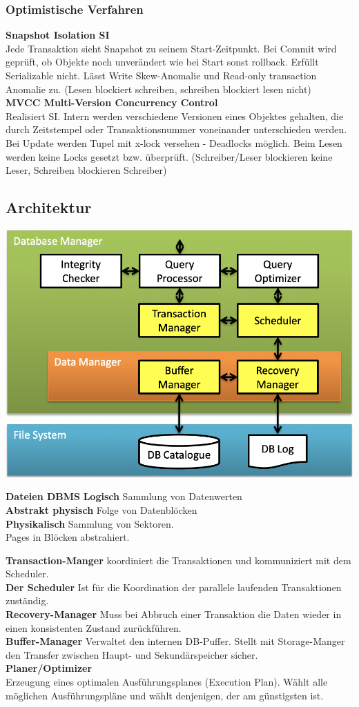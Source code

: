 \documentclass[7pt,landscape,a4paper]{scrartcl}
\begin{document}
\begin{multicols*}{4}
\subsubsection{Optimistische Verfahren}
\textbf{Snapshot Isolation SI}\\
 Jede Transaktion sieht Snapshot zu seinem Start-Zeitpunkt. Bei Commit wird geprüft, ob Objekte noch unverändert wie bei Start sonst rollback. Erfüllt Serializable nicht. Lässt Write Skew-Anomalie und Read-only transaction Anomalie zu. (Lesen blockiert schreiben, schreiben blockiert lesen nicht)\\
\textbf{MVCC Multi-Version Concurrency Control}\\
Realisiert SI. Intern werden verschiedene Versionen eines Objektes gehalten, die durch Zeitstempel oder Transaktionsnummer voneinander unterschieden werden. Bei Update werden Tupel mit x-lock versehen - Deadlocks möglich. Beim Lesen werden keine Locks gesetzt bzw. überprüft. (Schreiber/Leser blockieren keine Leser, Schreiben blockieren Schreiber)
\subsection{Architektur}
\includegraphics[width=0.75\linewidth]{architektur}
\begin{minipage}[b]{0,24\linewidth}
\textbf{Dateien DBMS}
\textbf{Logisch} Sammlung von Datenwerten\\
\textbf{Abstrakt physisch} Folge von Datenblöcken\\
\textbf{Physikalisch} Sammlung von Sektoren.\\
Pages in Blöcken abstrahiert.\\
\end{minipage}
\textbf{Transaction-Manger} koordiniert die Transaktionen und kommuniziert mit dem Scheduler.\\
\textbf{Der Scheduler} Ist für die Koordination der parallele laufenden Transaktionen zuständig. \\
\textbf{Recovery-Manager} Muss bei Abbruch einer Transaktion die Daten wieder in einen konsistenten Zustand zurückführen.\\
\textbf{Buffer-Manager} Verwaltet den internen DB-Puffer. Stellt mit Storage-Manger den Transfer zwischen Haupt- und Sekundärspeicher sicher.\\
\textbf{Planer/Optimizer}\\
Erzeugung eines optimalen Ausführungsplanes (Execution Plan). Wählt alle möglichen Ausführungspläne und wählt denjenigen, der am günstigsten ist. 

\end{multicols*}
\end{document}

